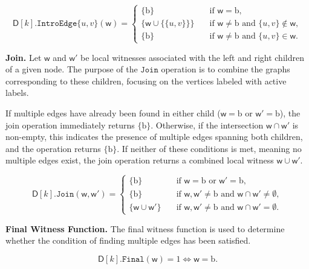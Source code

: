 \documentclass[11pt,a4paper]{article}
\newcommand{\treewidthvalue}{k}
\newcommand{\introedgegeneric}[2]{\mathtt{IntroEdge}\{#1,#2\}}
\newcommand{\joingenericcore}{\mathtt{Join}}
\newcommand{\finalwitnessgenericcore}{\mathtt{Final}}
\newcommand{\vertexone}{u}
\newcommand{\vertextwo}{v}
\newcommand{\awitness}{\mathsf{w}}
\newcommand{\dpcore}{\mathsf{D}}
\newcommand{\multiedgefound}{\mathrm{b}}
\begin{document}
{	\[
	\dpcore[\treewidthvalue].\introedgegeneric{\vertexone}{\vertextwo}(\awitness) =
		\begin{cases}
			\{\multiedgefound\} & \quad \text{if } \awitness = \multiedgefound, \\
			\{\awitness \cup \{\{\vertexone, \vertextwo\}\}\} & \quad \text{if } \awitness\neq\multiedgefound \text{ and } \{\vertexone, \vertextwo\} \notin \awitness, \\
			\{\multiedgefound\} & \quad \text{if } \awitness\neq\multiedgefound \text{ and } \{\vertexone, \vertextwo\} \in \awitness.
		\end{cases}
		\]

	\noindent\textbf{Join.}
	Let \(\awitness \) and \(\awitness'\) be local witnesses associated with the left and right children of a given node. The purpose of the \(\joingenericcore\) operation is to combine the graphs corresponding to these children, focusing on the vertices labeled with active labels.

	If multiple edges have already been found in either child (\(\awitness = \multiedgefound\) or \(\awitness'=\multiedgefound\)), the join operation immediately returns \(\{\multiedgefound\}\). Otherwise, if the intersection \(\awitness \cap \awitness'\) is non-empty, this indicates the presence of multiple edges spanning both children, and the operation returns \(\{\multiedgefound\}\). If neither of these conditions is met, meaning no multiple edges exist, the join operation returns a combined local witness \(\awitness \cup \awitness'\).

	\[
	\dpcore[\treewidthvalue].\joingenericcore(\awitness, \awitness') =
		\begin{cases}
			\{\multiedgefound\} & \quad \text{if } \awitness = \multiedgefound \text{ or } \awitness' = \multiedgefound, \\
			\{\multiedgefound\} & \quad \text{if } \awitness,\awitness'\neq\multiedgefound \text{ and } \awitness \cap \awitness' \neq \emptyset, \\
			\{\awitness \cup \awitness'\} & \quad \text{if } \awitness,\awitness'\neq\multiedgefound \text{ and } \awitness \cap \awitness' = \emptyset.
		\end{cases}
		\]

	\noindent\textbf{Final Witness Function.}
	The final witness function is used to determine whether the condition of finding multiple edges has been satisfied.

	\[
	\dpcore[\treewidthvalue].\finalwitnessgenericcore(\awitness) = 1 \iff \awitness = \multiedgefound.
	\]

}
\end{document}
